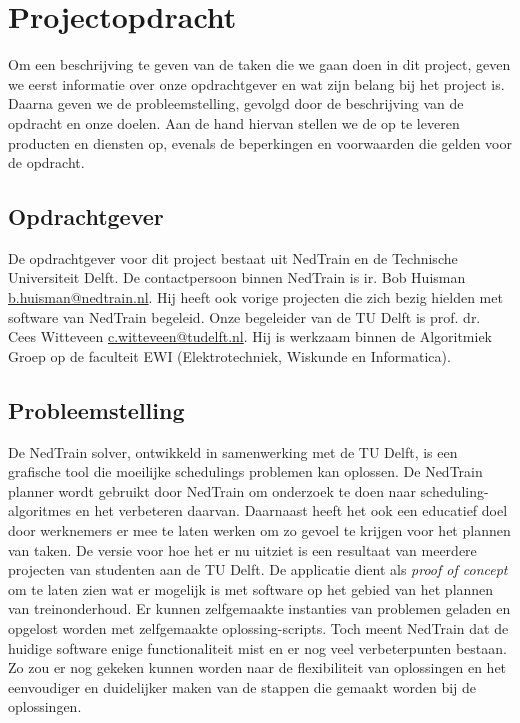 \section{Projectopdracht}
Om een beschrijving te geven van de taken die we gaan doen in dit project, geven we eerst informatie over onze opdrachtgever en wat zijn belang bij het project is. Daarna geven we de probleemstelling, gevolgd door de beschrijving van de opdracht en onze doelen. Aan de hand hiervan stellen we de op te leveren producten en diensten op, evenals de beperkingen en voorwaarden die gelden voor de opdracht.

\subsection{Opdrachtgever}
De opdrachtgever voor dit project bestaat uit NedTrain en de Technische Universiteit Delft.
De contactpersoon binnen NedTrain is ir. Bob Huisman \href{mailto:b.huisman@nedtrain.nl}{b.huisman@nedtrain.nl}. Hij heeft ook vorige projecten die zich bezig hielden met software van NedTrain begeleid. Onze begeleider van de TU Delft is prof. dr. Cees Witteveen \href{mailto:c.witteveen@tudelft.nl}{c.witteveen@tudelft.nl}. Hij is werkzaam binnen de Algoritmiek Groep op de faculteit EWI (Elektrotechniek, Wiskunde en Informatica).

\subsection{Probleemstelling}
De NedTrain solver, ontwikkeld in samenwerking met de TU Delft, is een grafische tool die moeilijke schedulings problemen kan oplossen. De NedTrain planner wordt gebruikt door NedTrain om onderzoek te doen naar scheduling-algoritmes en het verbeteren daarvan. Daarnaast heeft het ook een educatief doel door werknemers er mee te laten werken om zo gevoel te krijgen voor het plannen van taken. De versie voor hoe het er nu uitziet is een resultaat van meerdere projecten van studenten aan de TU Delft. De applicatie dient als \emph{proof of concept} om te laten zien wat er mogelijk is met software op het gebied van het plannen van treinonderhoud. Er kunnen zelfgemaakte instanties van problemen geladen en opgelost worden met zelfgemaakte oplossing-scripts. Toch meent NedTrain dat de huidige software enige functionaliteit mist en er nog veel verbeterpunten bestaan. Zo zou er nog gekeken kunnen worden naar de flexibiliteit van oplossingen en het eenvoudiger en duidelijker maken van de stappen die gemaakt worden bij de oplossingen. 

